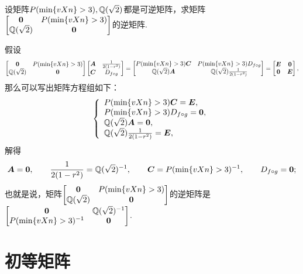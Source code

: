 \begin{example}
设矩阵\(\P,\Q\)都是可逆矩阵，求矩阵\(\begin{bmatrix}
\z & \P \\ \Q & \z
\end{bmatrix}\)的逆矩阵.
\begin{solution}
假设\[
\begin{bmatrix}
\z & \P \\ \Q & \z
\end{bmatrix} \begin{bmatrix}
\A & \B \\ \C & \D
\end{bmatrix} = \begin{bmatrix}
\P \C & \P \D \\
\Q \A & \Q \B
\end{bmatrix} = \begin{bmatrix}
\E & \z \\ \z & \E
\end{bmatrix},
\]那么可以写出矩阵方程组如下：\[
\left\{ \begin{array}{l}
\P \C = \E, \\
\P \D = \z, \\
\Q \A = \z, \\
\Q \B = \E,
\end{array} \right.
\]解得\[
\A = \z, \qquad
\B = \Q^{-1}, \qquad
\C = \P^{-1}, \qquad
\D = \z;
\]也就是说，矩阵\(\begin{bmatrix}
\z & \P \\ \Q & \z
\end{bmatrix}\)的逆矩阵是\(\begin{bmatrix}
\z & \Q^{-1} \\ \P^{-1} & \z
\end{bmatrix}\).
\end{solution}
\end{example}

\section{初等矩阵}
